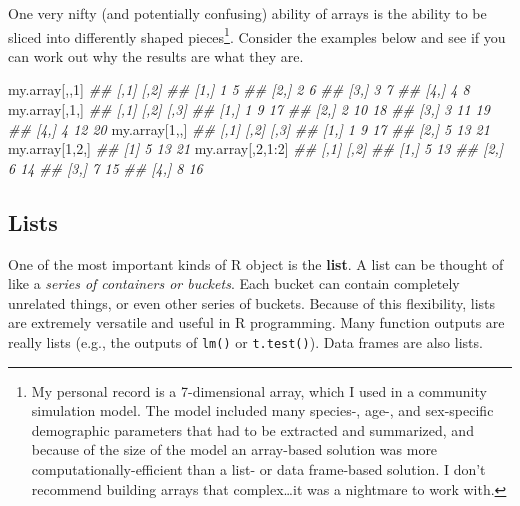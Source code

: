 \documentclass[
  13,
  letterpaper,
]{report}
\newenvironment{Shaded}{\begin{snugshade}}{\end{snugshade}}
\newcommand{\DecValTok}[1]{\textcolor[rgb]{0.68,0.00,0.00}{#1}}
\newcommand{\DocumentationTok}[1]{\textcolor[rgb]{0.37,0.37,0.37}{\textit{#1}}}
\newcommand{\NormalTok}[1]{\textcolor[rgb]{0.00,0.23,0.31}{#1}}
\newcommand{\SpecialCharTok}[1]{\textcolor[rgb]{0.37,0.37,0.37}{#1}}
\begin{document}
One very nifty (and potentially confusing) ability of arrays is the
ability to be sliced into differently shaped pieces\footnote{My personal
  record is a 7-dimensional array, which I used in a community
  simulation model. The model included many species-, age-, and
  sex-specific demographic parameters that had to be extracted and
  summarized, and because of the size of the model an array-based
  solution was more computationally-efficient than a list- or data
  frame-based solution. I don't recommend building arrays that
  complex\ldots it was a nightmare to work with.}. Consider the examples
below and see if you can work out why the results are what they are.

\begin{Shaded}
\begin{Highlighting}[]
\NormalTok{my.array[,,}\DecValTok{1}\NormalTok{]}
\DocumentationTok{\#\#      [,1] [,2]}
\DocumentationTok{\#\# [1,]    1    5}
\DocumentationTok{\#\# [2,]    2    6}
\DocumentationTok{\#\# [3,]    3    7}
\DocumentationTok{\#\# [4,]    4    8}
\NormalTok{my.array[,}\DecValTok{1}\NormalTok{,]}
\DocumentationTok{\#\#      [,1] [,2] [,3]}
\DocumentationTok{\#\# [1,]    1    9   17}
\DocumentationTok{\#\# [2,]    2   10   18}
\DocumentationTok{\#\# [3,]    3   11   19}
\DocumentationTok{\#\# [4,]    4   12   20}
\NormalTok{my.array[}\DecValTok{1}\NormalTok{,,]}
\DocumentationTok{\#\#      [,1] [,2] [,3]}
\DocumentationTok{\#\# [1,]    1    9   17}
\DocumentationTok{\#\# [2,]    5   13   21}
\NormalTok{my.array[}\DecValTok{1}\NormalTok{,}\DecValTok{2}\NormalTok{,]}
\DocumentationTok{\#\# [1]  5 13 21}
\NormalTok{my.array[,}\DecValTok{2}\NormalTok{,}\DecValTok{1}\SpecialCharTok{:}\DecValTok{2}\NormalTok{]}
\DocumentationTok{\#\#      [,1] [,2]}
\DocumentationTok{\#\# [1,]    5   13}
\DocumentationTok{\#\# [2,]    6   14}
\DocumentationTok{\#\# [3,]    7   15}
\DocumentationTok{\#\# [4,]    8   16}
\end{Highlighting}
\end{Shaded}

\subsection{Lists}\label{sec-03-struct-list}

One of the most important kinds of R object is the \textbf{list}. A list
can be thought of like a \emph{series of containers or buckets}. Each
bucket can contain completely unrelated things, or even other series of
buckets. Because of this flexibility, lists are extremely versatile and
useful in R programming. Many function outputs are really lists (e.g.,
the outputs of \texttt{lm()} or \texttt{t.test()}). Data frames are also
lists.
\end{document}
